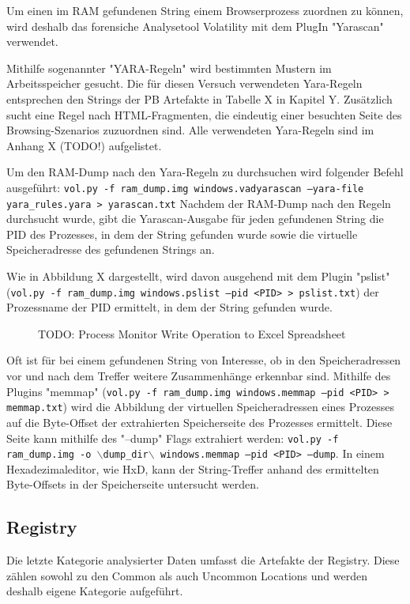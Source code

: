 Um einen im RAM gefundenen String einem Browserprozess zuordnen zu können, wird deshalb das forensiche Analysetool Volatility mit dem PlugIn "Yarascan" verwendet.

Mithilfe sogenannter "YARA-Regeln" wird bestimmten Mustern im Arbeitsspeicher gesucht.
Die für diesen Versuch verwendeten Yara-Regeln entsprechen den Strings der PB Artefakte in Tabelle X in Kapitel Y. Zusätzlich sucht eine Regel nach HTML-Fragmenten, die eindeutig einer besuchten Seite des Browsing-Szenarios zuzuordnen sind. \cite{Said.2011}
Alle verwendeten Yara-Regeln sind im Anhang X (TODO!) aufgelistet.

Um den RAM-Dump nach den Yara-Regeln zu durchsuchen wird folgender Befehl ausgeführt: \texttt{vol.py -f ram\_dump.img windows.vadyarascan --yara-file yara\_rules.yara > yarascan.txt}
Nachdem der RAM-Dump nach den Regeln durchsucht wurde, gibt die Yarascan-Ausgabe für jeden gefundenen String die PID des Prozesses, in dem der String gefunden wurde sowie die virtuelle Speicheradresse des gefundenen Strings an.

Wie in Abbildung X dargestellt, wird davon ausgehend mit dem Plugin "pslist" (\texttt{vol.py -f ram\_dump.img windows.pslist --pid <PID> > pslist.txt}) der Prozessname der PID ermittelt, in dem der String gefunden wurde.
\begin{figure}[h!]
	\centering
	\small
	\centerline{\resizebox{\linewidth}{!}{}}
	\caption{TODO: Process Monitor Write Operation to Excel Spreadsheet}
	\label{fig:jes}
\end{figure}

Oft ist für bei einem gefundenen String von Interesse, ob in den Speicheradressen vor und nach dem Treffer weitere Zusammenhänge erkennbar sind.
Mithilfe des Plugins "memmap" (\texttt{vol.py -f ram\_dump.img windows.memmap --pid <PID> > memmap.txt}) wird die Abbildung der virtuellen Speicheradressen eines Prozesses auf die Byte-Offset der extrahierten Speicherseite des Prozesses ermittelt.
Diese Seite kann mithilfe des "--dump" Flags extrahiert werden: \texttt{vol.py -f ram\_dump.img -o $\backslash$dump\_dir$\backslash$ windows.memmap --pid <PID> --dump}.
In einem Hexadezimaleditor, wie HxD, kann der String-Treffer anhand des ermittelten Byte-Offsets in der Speicherseite untersucht werden.

\subsection{Registry}
Die letzte Kategorie analysierter Daten umfasst die Artefakte der Registry.
Diese zählen sowohl zu den Common als auch Uncommon Locations und werden deshalb eigene Kategorie aufgeführt.

